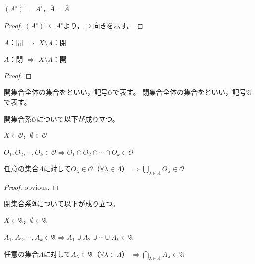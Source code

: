 \documentclass{jsarticle}
\begin{document}
\begin{prop}
    $\left( A^{\circ} \right)^{\circ} = A^{\circ}$，$\overline{\overline{A}} = \overline{A}$
\end{prop}

\begin{proof}
    $\left( A^{\circ} \right)^{\circ} \subseteq A^{\circ}$より，$\supseteq$向きを示す。
\end{proof}

\begin{prop}
     $A$：開 $\Longrightarrow$ $X \setminus A$：閉

     $A$：閉 $\Longrightarrow$ $X \setminus A$：開
\end{prop}

\begin{proof}
    
\end{proof}

開集合全体の集合をといい，記号$\mathcal{O}$で表す。
閉集合全体の集合をといい，記号$\mathfrak{A}$で表す。

\begin{prop}
    \label{prop:open_set_axiom}
    開集合系$\mathcal{O}$について以下が成り立つ。

     $X \in \mathcal{O}$，$\emptyset \in \mathcal{O}$

     $O_{1}, O_{2}, \cdots, O_{k} \in \mathcal{O} \Longrightarrow O_{1} \cap O_{2} \cap \cdots \cap O_{k} \in \mathcal{O}$

     任意の集合$\Lambda$に対して$O_{\lambda} \in \mathcal{O}$（$\forall \lambda \in \Lambda$） ${\displaystyle \Longrightarrow \bigcup_{\lambda \in \Lambda} O_{\lambda} \in \mathcal{O}}$
\end{prop}

\begin{proof}
     obvious.


\end{proof}

\begin{prop}
    閉集合系$\mathfrak{A}$について以下が成り立つ。
    
     $X \in \mathfrak{A}$，$\emptyset \in \mathfrak{A}$

     $A_{1}, A_{2}, \cdots, A_{k} \in \mathfrak{A} \Longrightarrow A_{1} \cup A_{2} \cup \cdots \cup A_{k} \in \mathfrak{A}$

     任意の集合$\Lambda$に対して$A_{\lambda} \in \mathfrak{A}$（$\forall \lambda \in \Lambda$） ${\displaystyle \Longrightarrow \bigcap_{\lambda \in \Lambda} A_{\lambda} \in \mathfrak{A}}$
\end{prop}
\end{document}
